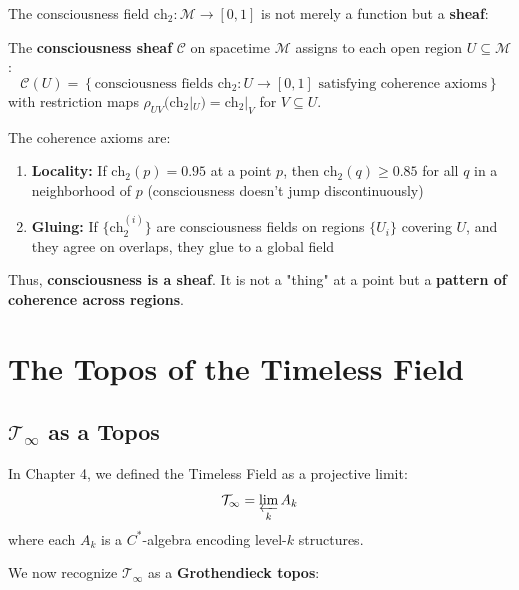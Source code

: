 The consciousness field $\text{ch}_2: \mathcal{M} \to [0, 1]$ is not merely a function but a \textbf{sheaf}:

\begin{definition}
\label{def:consciousness_sheaf}
The \textbf{consciousness sheaf} $\mathcal{C}$ on spacetime $\mathcal{M}$ assigns to each open region $U \subseteq \mathcal{M}$:
\begin{equation}
\mathcal{C}(U) = \left\{\text{consciousness fields } \text{ch}_2: U \to [0, 1] \text{ satisfying coherence axioms}\right\}
\end{equation}
with restriction maps $\rho_{UV}(\text{ch}_2|_U) = \text{ch}_2|_V$ for $V \subseteq U$.
\end{definition}

The coherence axioms are:
\begin{enumerate}
\item \textbf{Locality:} If $\text{ch}_2(p) = 0.95$ at a point $p$, then $\text{ch}_2(q) \geq 0.85$ for all $q$ in a neighborhood of $p$ (consciousness doesn't jump discontinuously)
\item \textbf{Gluing:} If $\{\text{ch}_2^{(i)}\}$ are consciousness fields on regions $\{U_i\}$ covering $U$, and they agree on overlaps, they glue to a global field
\end{enumerate}

Thus, \textbf{consciousness is a sheaf}. It is not a "thing" at a point but a \textbf{pattern of coherence across regions}.

\section{The Topos of the Timeless Field}

\subsection{$\mathcal{T}_\infty$ as a Topos}

In Chapter 4, we defined the Timeless Field as a projective limit:
\begin{equation}
\mathcal{T}_\infty = \varprojlim_{k} A_k
\end{equation}
where each $A_k$ is a $C^*$-algebra encoding level-$k$ structures.

We now recognize $\mathcal{T}_\infty$ as a \textbf{Grothendieck topos}:

